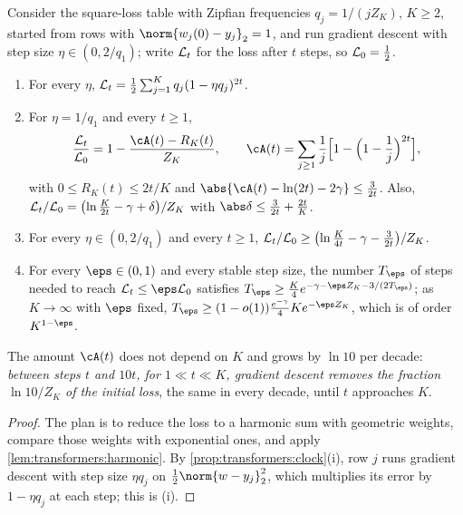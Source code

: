 \begin{refsection}
\begin{theorem}\label{thm:transformers:zipf}
Consider the square-loss table with Zipfian frequencies $q_j=1/(jZ_K)$, $K\ge2$, started from rows with $\norm{w_j(0)-y_j}_2=1$, and run gradient descent with step size $\eta\in(0,2/q_1)$; write $\mathcal{L}_t$ for the loss after $t$ steps, so $\mathcal{L}_0=\frac12$.
\begin{enumerate}
\item For every $\eta$, $\mathcal{L}_t=\frac12\sum_{j=1}^Kq_j(1-\eta q_j)^{2t}$.
\item For $\eta=1/q_1$ and every $t\ge1$,
\[
  \frac{\Loss_t}{\Loss_0}=1-\frac{\cA(t)-R_K(t)}{Z_K},\qquad \cA(t)=\sum_{j\ge1}\frac1j\Bigl[1-\Bigl(1-\frac1j\Bigr)^{2t}\Bigr],
\]
with $0\le R_K(t)\le2t/K$ and $\abs{\cA(t)-\ln(2t)-2\gamma}\le\frac3{2t}$. Also, $\mathcal{L}_t/\mathcal{L}_0=\bigl(\ln\frac K{2t}-\gamma+\delta\bigr)/Z_K$ with $\abs\delta\le\frac3{2t}+\frac{2t}K$.
\item For every $\eta\in(0,2/q_1)$ and every $t\ge1$, $\mathcal{L}_t/\mathcal{L}_0\ge\bigl(\ln\frac K{4t}-\gamma-\frac3{2t}\bigr)/Z_K$.
\item For every $\eps\in(0,1)$ and every stable step size, the number $T_\eps$ of steps needed to reach $\Loss_t\le\eps\Loss_0$ satisfies $T_\eps\ge\frac K4e^{-\gamma-\eps Z_K-3/(2T_\eps)}$; as $K\to\infty$ with $\eps$ fixed, $T_\eps\ge(1-o(1))\frac{e^{-\gamma}}4Ke^{-\eps Z_K}$, which is of order $K^{1-\eps}$.
\end{enumerate}
\end{theorem}

The amount $\cA(t)$ does not depend on $K$ and grows by $\ln10$ per decade: \emph{between steps $t$ and $10t$, for $1\ll t\ll K$, gradient descent removes the fraction $\ln10/Z_K$ of the initial loss}, the same in every decade, until $t$ approaches $K$.

\begin{proof}
The plan is to reduce the loss to a harmonic sum with geometric weights, compare those weights with exponential ones, and apply \cref{lem:transformers:harmonic}. By \cref{prop:transformers:clock}(i), row $j$ runs gradient descent with step size $\eta q_j$ on $\frac12\norm{w-y_j}_2^2$, which multiplies its error by $1-\eta q_j$ at each step; this is (i).


\end{proof}
\end{refsection}
